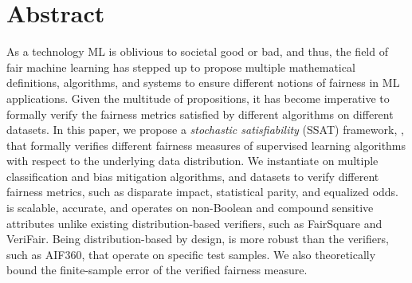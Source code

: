 \section{Abstract}
	As a technology ML is oblivious to societal good or bad, and thus, the field of fair machine learning has stepped up to propose multiple mathematical definitions, algorithms, and systems to ensure different notions of fairness in ML applications.
	Given the multitude of propositions, it has become imperative to formally verify the fairness metrics satisfied by different algorithms on different datasets.
	In this paper, we propose a \textit{stochastic satisfiability} (SSAT) framework, {\justicia}, that formally verifies different fairness measures of supervised learning algorithms with respect to the underlying data distribution.
	We instantiate {\justicia} on multiple classification and bias mitigation algorithms, and datasets to verify different fairness metrics, such as disparate impact, statistical parity, and equalized odds.
	{\justicia} is scalable, accurate, and operates on non-Boolean and compound sensitive attributes unlike existing distribution-based verifiers, such as FairSquare and VeriFair.
	Being distribution-based by design, {\justicia} is more robust than the verifiers, such as AIF360, that operate on specific test samples.
	We also theoretically bound the finite-sample error of the verified fairness measure.
